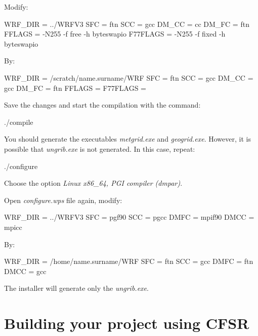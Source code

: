\noindent Modify:
\bigskip

\begin{bashcode}
WRF_DIR  = ../WRFV3
SFC      = ftn
SCC      = gcc
DM_CC    = cc
DM_FC    = ftn
FFLAGS   = -N255 -f free -h byteswapio
F77FLAGS = -N255 -f fixed -h byteswapio

\end{bashcode}
\bigskip

\noindent By:
\bigskip

\begin{bashcode}
WRF_DIR  = /scratch/name.surname/WRF
SFC      = ftn
SCC      = gcc
DM_CC    = gcc
DM_FC    = ftn
FFLAGS   =
F77FLAGS =
\end{bashcode}
\bigskip

\noindent Save the changes and start the compilation with the command:
\bigskip

\begin{bashcode}
./compile
\end{bashcode}
\bigskip

\noindent You should generate the executables \textit{metgrid.exe} and \textit{geogrid.exe}. However, it is possible that \textit{ungrib.exe} 
is not generated. In this case, repeat:
\bigskip

\begin{bashcode}
./configure
\end{bashcode}
\bigskip

\noindent Choose the option \textit{Linux x86\_64, PGI compiler (dmpar)}.
\bigskip

\noindent Open \textit{configure.wps} file again, modify:
\bigskip

\begin{bashcode}
WRF_DIR = ../WRFV3
SFC     = pgf90
SCC     = pgcc
DMFC    = mpif90
DMCC    = mpicc
\end{bashcode}
\bigskip

\noindent By:
\bigskip

\begin{bashcode}
WRF_DIR = /home/name.surname/WRF
SFC     = ftn
SCC     = gcc
DMFC    = ftn
DMCC    = gcc
\end{bashcode}
\bigskip

\noindent The installer will generate only the \textit{ungrib.exe}.

\section{Building your project using CFSR}
\bigskip

